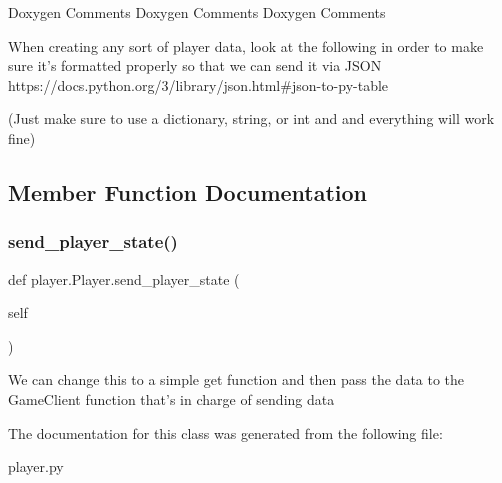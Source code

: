 \begin{DoxyVerb}Doxygen Comments Doxygen Comments Doxygen Comments
\end{DoxyVerb}
\begin{DoxyVerb}When creating any sort of player data, look at the following in order
to make sure it's formatted properly so that we can send it via JSON
https://docs.python.org/3/library/json.html#json-to-py-table

(Just make sure to use a dictionary, string, or int and and everything
will work fine)
\end{DoxyVerb}
 

\subsection{Member Function Documentation}
\mbox{\label{classplayer_1_1_player_a7f6ef8ead0059a55c2545ec110f3e53a}} 
\subsubsection{\texorpdfstring{send\+\_\+player\+\_\+state()}{send\_player\_state()}}
{\footnotesize\ttfamily def player.\+Player.\+send\+\_\+player\+\_\+state (\begin{DoxyParamCaption}\item[{}]{self }\end{DoxyParamCaption})}

\begin{DoxyVerb}We can change this to a simple get function and then pass the data
to the GameClient function that's in charge of sending data
\end{DoxyVerb}
 

The documentation for this class was generated from the following file\+:\begin{DoxyCompactItemize}
\item 
player.\+py\end{DoxyCompactItemize}
